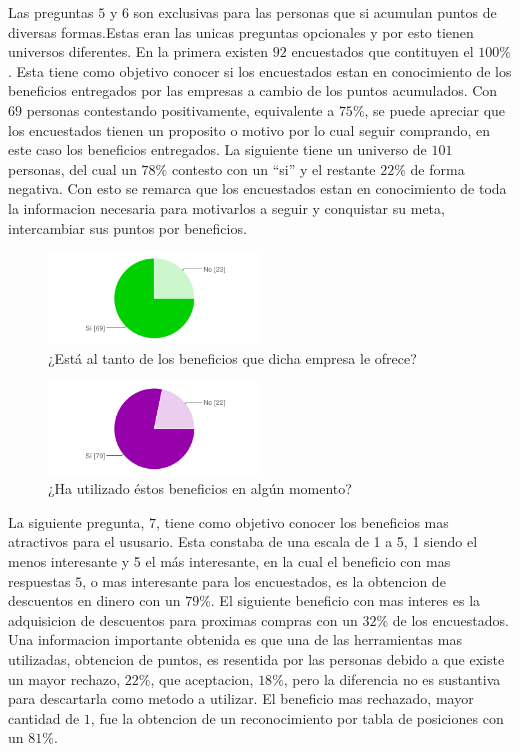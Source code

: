 Las preguntas $5$ y $6$ son exclusivas para las personas que si acumulan puntos de diversas formas.Estas
eran las unicas preguntas opcionales y por esto tienen universos diferentes.
En la primera existen $92$ encuestados que contituyen el $100\%$. Esta tiene como objetivo conocer
si los encuestados estan en conocimiento de los beneficios entregados por las empresas a cambio de
 los puntos acumulados. Con $69$ personas contestando positivamente, equivalente a $75\%$, se puede
apreciar que los encuestados tienen un proposito o motivo por lo cual seguir comprando, en este caso
los beneficios entregados.
La siguiente tiene un universo de $101$ personas, del cual un $78\%$ contesto con un ``si'' y el
restante $22\%$ de forma negativa. Con esto se remarca que los encuestados estan en conocimiento
de toda la informacion necesaria para motivarlos a seguir y conquistar su meta, intercambiar sus
puntos por beneficios.

\begin{figure}[!htb]
  \centering
  \includegraphics[width=0.5\textwidth]{images/chartPreg5.png}
  \caption[chart5]{¿Está al tanto de los beneficios que dicha empresa le ofrece?}
  \label{fig:chart2}
\end{figure}


\begin{figure}[!htb]
  \centering
  \includegraphics[width=0.5\textwidth]{images/chartPreg6.png}
  \caption[chart6]{¿Ha utilizado éstos beneficios en algún momento?}
  \label{fig:chart2}
\end{figure}

La siguiente pregunta, $7$, tiene como objetivo conocer los beneficios mas atractivos para el ususario.
Esta constaba de una escala de 1 a 5, 1 siendo el menos interesante y 5 el más interesante, en la cual
el beneficio con mas respuestas $5$, o mas interesante para los encuestados, es la obtencion de
descuentos en dinero con un $79\%$. El siguiente beneficio con mas interes es la adquisicion de descuentos
para proximas compras con un $32\%$ de los encuestados. Una informacion importante obtenida es que
una de las herramientas mas utilizadas, obtencion de puntos, es resentida por las personas debido a
que existe un mayor rechazo, $22\%$, que aceptacion, $18\%$, pero la diferencia no es sustantiva para
descartarla como metodo a utilizar. El beneficio mas rechazado, mayor cantidad de $1$, fue la
obtencion de un reconocimiento por tabla de posiciones con un $81\%$.

